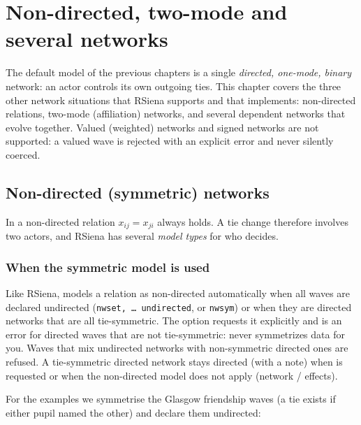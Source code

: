 \chapter{Non-directed, two-mode and several networks}\label{ch:networktypes}
\begingroup\raggedright\sloppy

The default model of the previous chapters is a single \emph{directed, one-mode, binary} network: an actor controls its own outgoing ties. This chapter covers the three other network situations that RSiena supports and that \nwsaom{} implements: non-directed relations, two-mode (affiliation) networks, and several dependent networks that evolve together. Valued (weighted) networks and signed networks are not supported: a valued wave is rejected with an explicit error and never silently coerced.

\section{Non-directed (symmetric) networks}\label{sec:symmetric}

In a non-directed relation $x_{ij} = x_{ji}$ always holds. A tie change therefore involves two actors, and RSiena has several \emph{model types} for who decides.

\subsection{When the symmetric model is used}

Like RSiena, \nwsaom{} models a relation as non-directed automatically when all waves are declared undirected (\texttt{nwset, \dots{} undirected}, or \texttt{nwsym}) or when they are directed networks that are all tie-symmetric. The option  requests it explicitly and is an error for directed waves that are not tie-symmetric: \nwsaom{} never symmetrizes data for you. Waves that mix undirected networks with non-symmetric directed ones are refused. A tie-symmetric directed network stays directed (with a note) when  is requested or when the non-directed model does not apply (network / effects).

For the examples we symmetrise the Glasgow friendship waves (a tie exists if either pupil named the other) and declare them undirected:

